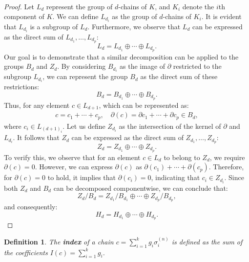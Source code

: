 \documentclass{amsart}
\newtheorem{definition}{Definition}[section]
\begin{document}
\begin{proof}
Let $L_d$ represent the group of $d$-chains of $K$, and $K_i$ denote the $i$th component of $K$. We can define $L_{d_i}$ as the group of $d$-chains of $K_i$. It is evident that $L_{d_i}$ is a subgroup of $L_d$. Furthermore, we observe that $L_d$ can be expressed as the direct sum of $L_{d_1}, \ldots, L_{d_p}$:
\begin{equation}
L_d = L_{d_1} \oplus \cdots \oplus L_{d_p}.
\end{equation}
Our goal is to demonstrate that a similar decomposition can be applied to the groups $B_d$ and $Z_d$. By considering $B_{d_i}$ as the image of $\partial$ restricted to the subgroup $L_{d_i}$, we can represent the group $B_d$ as the direct sum of these restrictions:
\begin{equation}
B_d = B_{d_1} \oplus \cdots \oplus B_{d_p}.
\end{equation}
Thus, for any element $c \in L_{d+1}$, which can be represented as:
\begin{align}
c = c_1 + \cdots + c_p, \quad \partial(c) = \partial c_1 + \cdots + \partial c_p \in B_d,
\end{align}
where $c_i \in L_{{(d+1)}_i}$.
Let us define $Z_{d_i}$ as the intersection of the kernel of $\partial$ and $L_{d_i}$. It follows that $Z_d$ can be expressed as the direct sum of $Z_{d_1}, \ldots, Z_{d_p}$:
\begin{equation}
Z_d = Z_{d_1} \oplus \cdots \oplus Z_{d_p}.
\end{equation}
To verify this, we observe that for an element $c \in L_d$ to belong to $Z_d$, we require $\partial(c) = 0$. However, we can express $\partial(c)$ as $\partial(c_1) + \cdots + \partial(c_p)$. Therefore, for $\partial(c) = 0$ to hold, it implies that $\partial(c_i) = 0$, indicating that $c_i \in Z_{d_i}$.
Since both $Z_d$ and $B_d$ can be decomposed componentwise, we can conclude that:
\begin{equation}
Z_d / B_d = Z_{d_1} / B_{d_1} \oplus \cdots \oplus Z_{d_p} / B_{d_p},
\end{equation}
and consequently:
\begin{equation}
H_d = H_{d_1} \oplus \cdots \oplus H_{d_p}.
\end{equation}
\end{proof}

\begin{definition}
The \textbf{index} of a chain $c = \sum_{i=1}^{k} g_i \sigma_i^{(n)}$ is defined as the sum of the coefficients $I(c) = \sum_{i=1}^{k} g_i$.
\end{definition}
\end{document}

